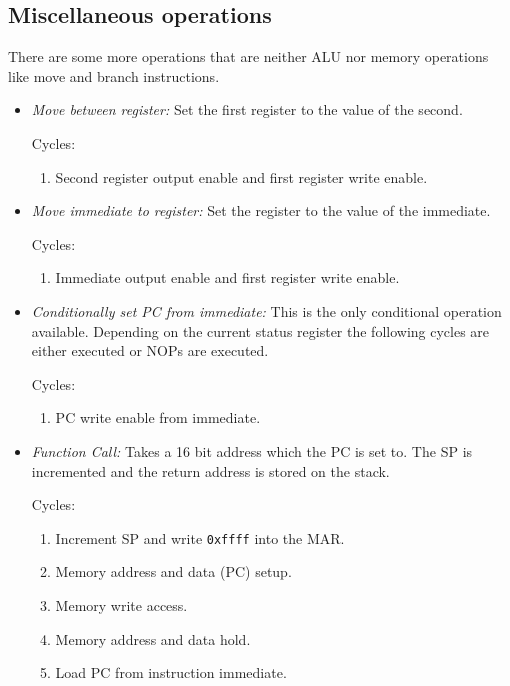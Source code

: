 \subsection{Miscellaneous operations}
There are some more operations that are neither \gls{ALU} nor memory operations like move and branch instructions.
\begin{itemize}
  \item \emph{Move between register:} Set the first register to the value of the second.

  Cycles:
  \begin{enumerate}
    \item Second register output enable and first register write enable.
  \end{enumerate}

  \item \emph{Move immediate to register:} Set the register to the value of the immediate.

  Cycles:
  \begin{enumerate}
    \item Immediate output enable and first register write enable.
  \end{enumerate}

  \item \emph{Conditionally set \gls{PC} from immediate:} This is the only conditional operation available.
  Depending on the current status register the following cycles are either executed or \glspl{NOP} are executed.

  Cycles:
  \begin{enumerate}
    \item \gls{PC} write enable from immediate.
  \end{enumerate}

  \item \emph{Function Call:} Takes a 16 bit address which the \gls{PC} is set to.
  The \gls{SP} is incremented and the return address is stored on the stack.

  Cycles:
  \begin{enumerate}
    \item Increment \gls{SP} and write \texttt{0xffff} into the \gls{MAR}.
    \item Memory address and data (\gls{PC}) setup.
    \item Memory write access.
    \item Memory address and data hold.
    \item Load \gls{PC} from instruction immediate.
  \end{enumerate}


\end{itemize}
